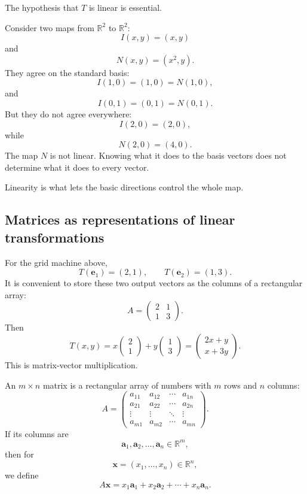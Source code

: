 The hypothesis that \(T\) is linear is essential.

\begin{example}
Consider two maps from \(\mathbb R^2\) to \(\mathbb R^2\):
\[
    I(x,y)=(x,y)
\]
and
\[
    N(x,y)=(x^2,y).
\]
They agree on the standard basis:
\[
    I(1,0)=(1,0)=N(1,0),
\]
and
\[
    I(0,1)=(0,1)=N(0,1).
\]
But they do not agree everywhere:
\[
    I(2,0)=(2,0),
\]
while
\[
    N(2,0)=(4,0).
\]
The map \(N\) is not linear.  Knowing what it does to the basis vectors does not
determine what it does to every vector.
\end{example}

Linearity is what lets the basic directions control the whole map.

\subsection{Matrices as representations of linear transformations}

For the grid machine above,
\[
    T(\mathbf e_1)=(2,1),
    \qquad
    T(\mathbf e_2)=(1,3).
\]
It is convenient to store these two output vectors as the columns of a rectangular array:
\[
    A=
    \begin{pmatrix}
        2&1\\
        1&3
    \end{pmatrix}.
\]
Then
\[
    T(x,y)
    =
    x\begin{pmatrix}2\\1\end{pmatrix}
    +
    y\begin{pmatrix}1\\3\end{pmatrix}
    =
    \begin{pmatrix}
        2x+y\\
        x+3y
    \end{pmatrix}.
\]
This is matrix-vector multiplication.

\begin{definition}[Matrix]
An \(m\times n\) matrix is a rectangular array of numbers with \(m\) rows and \(n\)
columns:
\[
    A=
    \begin{pmatrix}
        a_{11}&a_{12}&\cdots&a_{1n}\\
        a_{21}&a_{22}&\cdots&a_{2n}\\
        \vdots&\vdots&\ddots&\vdots\\
        a_{m1}&a_{m2}&\cdots&a_{mn}
    \end{pmatrix}.
\]
If its columns are
\[
    \mathbf a_1,\mathbf a_2,\ldots,\mathbf a_n\in\mathbb R^m,
\]
then for
\[
    \mathbf x=(x_1,\ldots,x_n)\in\mathbb R^n,
\]
we define
\[
\boxed{
    A\mathbf x
    =
    x_1\mathbf a_1+x_2\mathbf a_2+\cdots+x_n\mathbf a_n.
}
\]
\end{definition}

